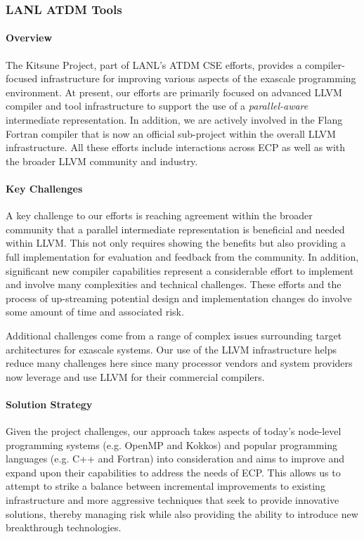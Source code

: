 \subsubsection{ LANL ATDM Tools}

\paragraph{Overview}
The Kitsune Project, part of LANL's ATDM CSE efforts, provides a
compiler-focused infrastructure for improving various aspects of the
exascale programming environment.  At present, our efforts are primarily
focused on advanced LLVM compiler and tool infrastructure to support the
use of a \emph{parallel-aware} intermediate representation.  In
addition, we are actively involved in the Flang Fortran compiler that
is now an official sub-project within the overall LLVM infrastructure.
All these efforts include interactions across ECP as well as
with the broader LLVM community and industry.  

\paragraph{Key Challenges}
A key challenge to our efforts is reaching agreement within the broader community that
a parallel intermediate representation is beneficial and needed within
LLVM.  This not only requires showing the benefits but also providing a
full implementation for evaluation and feedback from the community.
In addition, significant new compiler capabilities represent a
considerable effort to implement and involve many complexities and technical
challenges.  These efforts and the process of up-streaming potential
design and implementation changes do involve some amount of time and
associated risk. 

Additional challenges come from a range of complex issues surrounding
target architectures for exascale systems.  Our use of the LLVM
infrastructure helps reduce many challenges here since many processor
vendors and system providers now leverage and use LLVM for their
commercial compilers.

\paragraph{Solution Strategy}
Given the project challenges, our approach takes aspects of
today's node-level programming systems (e.g. OpenMP and Kokkos) and
popular programming languages (e.g. C++ and Fortran) into
consideration and aims to improve and expand upon their capabilities
to address the needs of ECP.  This allows us to attempt to strike a
balance between incremental improvements to existing infrastructure
and more aggressive techniques that seek to provide innovative
solutions, thereby managing risk while also providing the ability to introduce new
breakthrough technologies.


